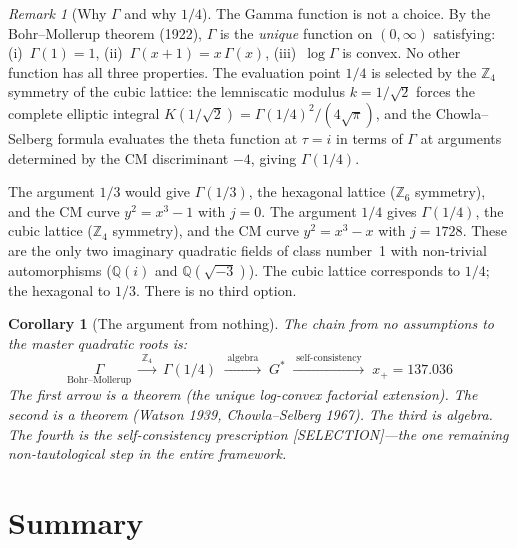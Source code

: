 \documentclass[12pt]{article}
\newtheorem{corollary}[theorem]{Corollary}
\theoremstyle{definition}
\theoremstyle{remark}
\newtheorem{remark}[theorem]{Remark}
\begin{document}
\begin{remark}[Why $\Gamma$ and why $1/4$]
The Gamma function is not a choice. By the Bohr--Mollerup theorem (1922), $\Gamma$ is the \emph{unique} function on $(0,\infty)$ satisfying: (i)~$\Gamma(1) = 1$, (ii)~$\Gamma(x+1) = x\,\Gamma(x)$, (iii)~$\log\Gamma$ is convex. No other function has all three properties. The evaluation point $1/4$ is selected by the $\mathbb{Z}_4$ symmetry of the cubic lattice: the lemniscatic modulus $k = 1/\sqrt{2}$ forces the complete elliptic integral $K(1/\sqrt{2}) = \Gamma(1/4)^2/(4\sqrt{\pi})$, and the Chowla--Selberg formula evaluates the theta function at $\tau = i$ in terms of $\Gamma$ at arguments determined by the CM discriminant $-4$, giving $\Gamma(1/4)$.

The argument $1/3$ would give $\Gamma(1/3)$, the hexagonal lattice ($\mathbb{Z}_6$ symmetry), and the CM curve $y^2 = x^3 - 1$ with $j = 0$. The argument $1/4$ gives $\Gamma(1/4)$, the cubic lattice ($\mathbb{Z}_4$ symmetry), and the CM curve $y^2 = x^3 - x$ with $j = 1728$. These are the only two imaginary quadratic fields of class number~1 with non-trivial automorphisms ($\mathbb{Q}(i)$ and $\mathbb{Q}(\sqrt{-3})$). The cubic lattice corresponds to $1/4$; the hexagonal to $1/3$. There is no third option.
\end{remark}

\begin{corollary}[The argument from nothing]
The chain from no assumptions to the master quadratic roots is:
\begin{equation}
    \underset{\text{Bohr--Mollerup}}{\Gamma} \;\xrightarrow{\;\mathbb{Z}_4\;}\; \Gamma(1/4) \;\xrightarrow{\;\text{algebra}\;}\; G^* \;\xrightarrow{\;\text{self-consistency}\;}\; x_+ = 137.036
\end{equation}
The first arrow is a theorem (the unique log-convex factorial extension). The second is a theorem (Watson 1939, Chowla--Selberg 1967). The third is algebra. The fourth is the self-consistency prescription \emph{[SELECTION]}---the one remaining non-tautological step in the entire framework.
\end{corollary}

\section{Summary}
\end{document}

